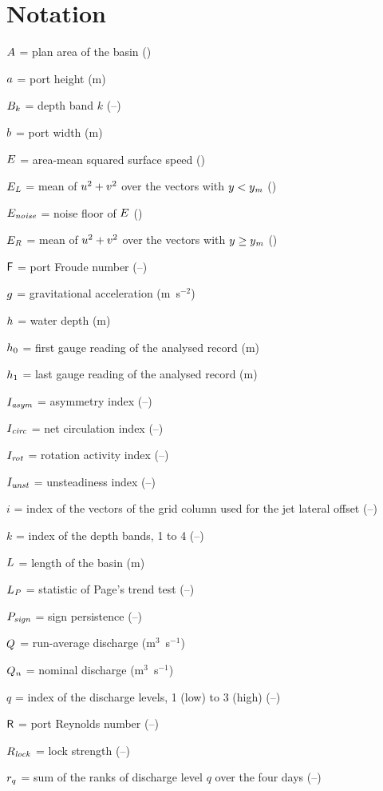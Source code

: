 \section*{Notation}

$A$ = plan area of the basin (\sqm)

$a$ = port height (m)

$B_{k}$ = depth band $k$ (--)

$b$ = port width (m)

$E$ = area-mean squared surface speed (\sqmpss)

$E_{\mathit{L}}$ = mean of $u^{2} + v^{2}$ over the vectors with $y < y_{\mathit{m}}$ (\sqmpss)

$E_{\mathit{noise}}$ = noise floor of $E$ (\sqmpss)

$E_{\mathit{R}}$ = mean of $u^{2} + v^{2}$ over the vectors with $y \ge y_{\mathit{m}}$ (\sqmpss)

$\mathsf{F}$ = port Froude number (--)

$g$ = gravitational acceleration (m~s$^{-2}$)

$h$ = water depth (m)

$h_{0}$ = first gauge reading of the analysed record (m)

$h_{1}$ = last gauge reading of the analysed record (m)

$I_{\mathit{asym}}$ = asymmetry index (--)

$I_{\mathit{circ}}$ = net circulation index (--)

$I_{\mathit{rot}}$ = rotation activity index (--)

$I_{\mathit{unst}}$ = unsteadiness index (--)

$i$ = index of the vectors of the grid column used for the jet lateral offset (--)

$k$ = index of the depth bands, 1 to 4 (--)

$L$ = length of the basin (m)

$L_{\mathit{P}}$ = statistic of Page's trend test (--)

$P_{\mathit{sign}}$ = sign persistence (--)

$Q$ = run-average discharge (m$^{3}$~s$^{-1}$)

$Q_{\mathit{n}}$ = nominal discharge (m$^{3}$~s$^{-1}$)

$q$ = index of the discharge levels, 1 (low) to 3 (high) (--)

$\mathsf{R}$ = port Reynolds number (--)

$R_{\mathit{lock}}$ = lock strength (--)

$r_{q}$ = sum of the ranks of discharge level $q$ over the four days (--)

